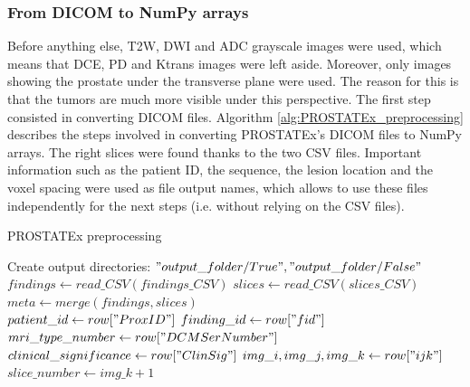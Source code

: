 \subsubsection{From DICOM to NumPy arrays}
\label{sec:DICOMtoNumPy}
Before anything else, T2W, DWI and ADC grayscale images were used, which means that DCE, PD and Ktrans images were left aside. Moreover, only images showing the prostate under the transverse plane were used. The reason for this is that the tumors are much more visible under this perspective. 
The first step consisted in converting DICOM files. Algorithm \ref{alg:PROSTATEx_preprocessing} describes the steps involved in converting PROSTATEx's DICOM files to NumPy arrays. The right slices were found thanks to the two CSV files. Important information such as the patient ID, the sequence, the lesion location and the voxel spacing were used as file output names, which allows to use these files independently for the next steps (i.e. without relying on the CSV files). 

\begin{algorithm}
    \caption{PROSTATEx preprocessing}
    \label{alg:PROSTATEx_preprocessing}
    \begin{algorithmic}[1] %
        		\State Create output directories: $"output\_folder/True", "output\_folder/False"$\\
        		\State $findings \gets read\_CSV(findings\_CSV)$ 
        		\State $slices \gets read\_CSV(slices\_CSV)$ 
            \State $meta \gets merge(findings, slices)$\\
            		\State $patient\_id \gets row["ProxID"]$
            		\State $finding\_id \gets row["fid"]$
            		\State $mri\_type\_number \gets row["DCMSerNumber"]$
            		\State $clinical\_significance \gets row["ClinSig"]$
            		\State $img\_i, img\_j, img\_k \gets row["ijk"]$
            		\State $slice\_number \gets img\_k + 1$ \\
                						 
                					\EndIf
                				\EndFor
                			\EndIf
            			\EndFor
            		\EndFor
            \EndFor
        \EndProcedure
    \end{algorithmic}
\end{algorithm} 


